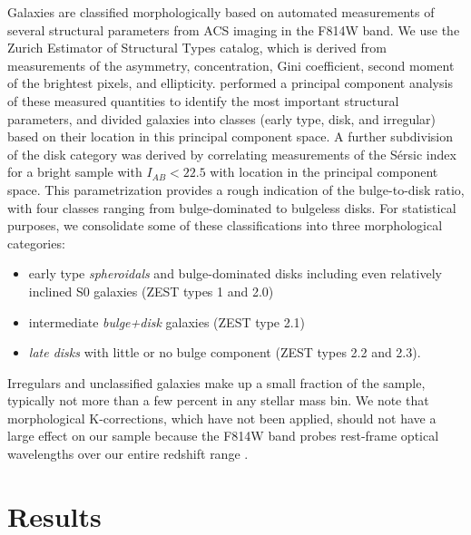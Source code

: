 \documentclass[12pt]{emulateapj}
\begin{document}
Galaxies are classified morphologically based on automated
measurements of several structural parameters from ACS imaging
in the F814W band. We use the Zurich Estimator of Structural Types
\citep[ZEST;][]{Scarlata2007} catalog, which is derived from
measurements of the asymmetry, concentration, Gini coefficient, second
moment of the brightest pixels, and ellipticity. \citet{Scarlata2007}
performed a principal component analysis of these measured quantities
to identify the most important structural parameters, and divided
galaxies into classes (early type, disk, and irregular) based on their
location in this principal component space. A further subdivision of
the disk category was derived by correlating measurements of the
S\'{e}rsic index for a bright sample with $I_{AB}<22.5$ with location in the principal
component space. This parametrization provides a rough indication of
the bulge-to-disk ratio, with four classes ranging from
bulge-dominated to bulgeless disks. For statistical purposes, we
consolidate some of these classifications into three morphological
categories: 
\begin{itemize}
\item{early type \textit{spheroidals} and bulge-dominated
disks including even relatively inclined S0 galaxies (ZEST types 1 and
2.0)}
\item{intermediate \textit{bulge+disk} galaxies (ZEST type 2.1)}
\item{\textit{late disks} with little or no bulge component (ZEST types 2.2 and
2.3).}
\end{itemize}
Irregulars and unclassified galaxies make up a small fraction of
the sample, typically not more than a few percent in any stellar mass
bin. We note that morphological K-corrections, which have not been
applied, should not have a large effect on our sample because the F814W band probes rest-frame
optical wavelengths over our entire redshift range
\citep[e.g.,][]{Lotz2004, Cassata2005, Bundy2010}.


\section{Results}
\label{s:results}
\end{document}
